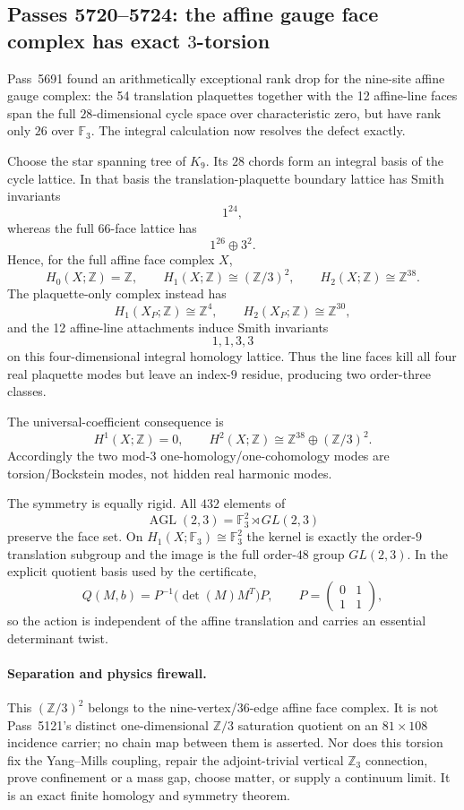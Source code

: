 \ifdefined\W
\subsection*{Passes 5720--5724: the affine gauge face complex has exact $3$-torsion}
Pass~5691 found an arithmetically exceptional rank drop for the nine-site affine gauge complex: the 54 translation plaquettes together with the 12 affine-line faces span the full $28$-dimensional cycle space over characteristic zero, but have rank only $26$ over $\mathbb F_3$.  The integral calculation now resolves the defect exactly.

Choose the star spanning tree of $K_9$.  Its $28$ chords form an integral basis of the cycle lattice.  In that basis the translation-plaquette boundary lattice has Smith invariants
\[
1^{24},
\]
whereas the full 66-face lattice has
\[
\boxed{1^{26}\oplus3^2.}
\]
Hence, for the full affine face complex $X$,
\[
\boxed{H_0(X;\mathbb Z)=\mathbb Z,\qquad
H_1(X;\mathbb Z)\cong(\mathbb Z/3)^2,\qquad
H_2(X;\mathbb Z)\cong\mathbb Z^{38}.}
\]
The plaquette-only complex instead has
\[
H_1(X_P;\mathbb Z)\cong\mathbb Z^4,
\qquad H_2(X_P;\mathbb Z)\cong\mathbb Z^{30},
\]
and the 12 affine-line attachments induce Smith invariants
\[
\boxed{1,1,3,3}
\]
on this four-dimensional integral homology lattice.  Thus the line faces kill all four real plaquette modes but leave an index-$9$ residue, producing two order-three classes.

The universal-coefficient consequence is
\[
H^1(X;\mathbb Z)=0,
\qquad
\boxed{H^2(X;\mathbb Z)\cong\mathbb Z^{38}\oplus(\mathbb Z/3)^2.}
\]
Accordingly the two mod-$3$ one-homology/one-cohomology modes are torsion/Bockstein modes, not hidden real harmonic modes.

The symmetry is equally rigid.  All $432$ elements of
\[
\operatorname{AGL}(2,3)=\mathbb F_3^2\rtimes GL(2,3)
\]
preserve the face set.  On $H_1(X;\mathbb F_3)\cong\mathbb F_3^2$ the kernel is exactly the order-$9$ translation subgroup and the image is the full order-$48$ group $GL(2,3)$.  In the explicit quotient basis used by the certificate,
\[
Q(M,b)=P^{-1}\bigl(\det(M)M^T\bigr)P,
\qquad
P=\begin{pmatrix}0&1\\1&1\end{pmatrix},
\]
so the action is independent of the affine translation and carries an essential determinant twist.

\paragraph{Separation and physics firewall.}
This $(\mathbb Z/3)^2$ belongs to the nine-vertex/36-edge affine face complex.  It is not Pass~5121's distinct one-dimensional $\mathbb Z/3$ saturation quotient on an $81\times108$ incidence carrier; no chain map between them is asserted.  Nor does this torsion fix the Yang--Mills coupling, repair the adjoint-trivial vertical $\mathbb Z_3$ connection, prove confinement or a mass gap, choose matter, or supply a continuum limit.  It is an exact finite homology and symmetry theorem.
\fi
